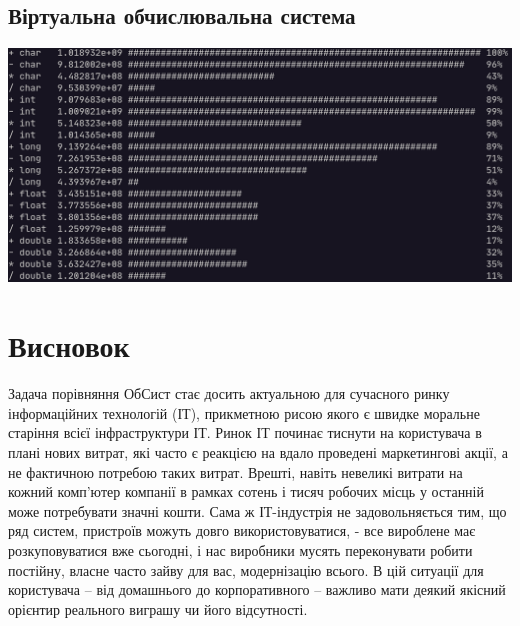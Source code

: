 \documentclass[a4paper,12pt]{report}
\begin{document}
\subsection{Віртуальна обчислювальна система} \begin{center}\includegraphics[scale=0.4]{vir}\end{center}

\section{Висновок}
Задача порівняння ОбСист стає досить актуальною для сучасного ринку інформаційних технологій (ІТ), прикметною рисою якого є швидке моральне старіння всієї інфраструктури ІТ. Ринок ІТ починає тиснути на користувача в плані нових витрат, які часто є реакцією на вдало проведені маркетингові акції, а не фактичною потребою таких витрат. Врешті, навіть невеликі витрати на кожний комп’ютер компанії в рамках сотень і тисяч робочих місць у останній може потребувати значні кошти. Сама ж ІТ-індустрія не задовольняється тим, що ряд систем, пристроїв можуть довго використовуватися, - все вироблене має розкуповуватися вже сьогодні, і нас виробники мусять переконувати робити постійну, власне часто зайву для вас, модернізацію всього. В цій ситуації для користувача – від домашнього до корпоративного – важливо мати деякий якісний орієнтир реального виграшу чи його відсутності.
\end{document}
